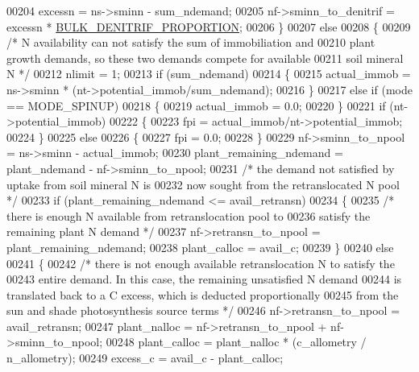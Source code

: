 \begin{DoxyCode}
00204         excessn = ns->sminn - sum\_ndemand;
00205         nf->sminn\_to\_denitrif = excessn * \hyperlink{daily__allocation_8c_a4c8a08fb632dd0b90b193f4f679a3f3f}{BULK\_DENITRIF\_PROPORTION};
00206     \}
00207     \textcolor{keywordflow}{else}
00208     \{
00209         \textcolor{comment}{/* N availability can not satisfy the sum of immobiliation and}
00210 \textcolor{comment}{        plant growth demands, so these two demands compete for available}
00211 \textcolor{comment}{        soil mineral N */}
00212         nlimit = 1;
00213         \textcolor{keywordflow}{if} (sum\_ndemand)
00214         \{
00215             actual\_immob = ns->sminn * (nt->potential\_immob/sum\_ndemand);
00216         \}
00217         \textcolor{keywordflow}{else} \textcolor{keywordflow}{if} (mode == MODE\_SPINUP)
00218         \{
00219             actual\_immob = 0.0;
00220         \}
00221         \textcolor{keywordflow}{if} (nt->potential\_immob)
00222         \{
00223             fpi = actual\_immob/nt->potential\_immob;
00224         \}
00225         \textcolor{keywordflow}{else}
00226         \{
00227             fpi = 0.0;
00228         \}
00229         nf->sminn\_to\_npool = ns->sminn - actual\_immob;
00230         plant\_remaining\_ndemand = plant\_ndemand - nf->sminn\_to\_npool;
00231         \textcolor{comment}{/* the demand not satisfied by uptake from soil mineral N is}
00232 \textcolor{comment}{        now sought from the retranslocated N pool */}
00233         \textcolor{keywordflow}{if} (plant\_remaining\_ndemand <= avail\_retransn)
00234         \{
00235             \textcolor{comment}{/* there is enough N available from retranslocation pool to}
00236 \textcolor{comment}{            satisfy the remaining plant N demand */}
00237             nf->retransn\_to\_npool = plant\_remaining\_ndemand;
00238             plant\_calloc = avail\_c;
00239         \}
00240         \textcolor{keywordflow}{else}
00241         \{
00242             \textcolor{comment}{/* there is not enough available retranslocation N to satisfy the}
00243 \textcolor{comment}{            entire demand. In this case, the remaining unsatisfied N demand}
00244 \textcolor{comment}{            is translated back to a C excess, which is deducted proportionally}
00245 \textcolor{comment}{            from the sun and shade photosynthesis source terms */}
00246             nf->retransn\_to\_npool = avail\_retransn;
00247             plant\_nalloc = nf->retransn\_to\_npool + nf->sminn\_to\_npool;
00248             plant\_calloc = plant\_nalloc * (c\_allometry / n\_allometry);
00249             excess\_c = avail\_c - plant\_calloc;

\end{DoxyCode}
